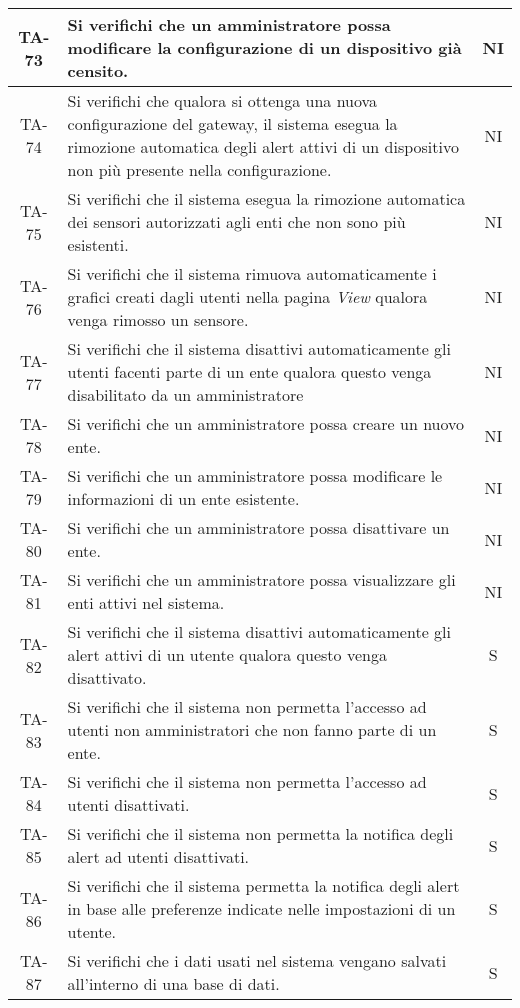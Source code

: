 \begin{center}
\begin{longtable}{|c|p{10cm}|c|}
			 \hline
			 TA-73 & Si verifichi che un amministratore possa modificare la configurazione di un dispositivo già censito. & NI \\
			 \hline
			 TA-74 & Si verifichi che qualora si ottenga una nuova configurazione del gateway, il sistema esegua la rimozione automatica degli alert attivi di un dispositivo non più presente nella configurazione. & NI \\
			 \hline
			 TA-75 & Si verifichi che il sistema esegua la rimozione automatica dei sensori autorizzati agli enti che non sono più esistenti. & NI \\
			 \hline
			 TA-76 & Si verifichi che il sistema rimuova automaticamente i grafici creati dagli utenti nella pagina \textit{View} qualora venga rimosso un sensore. & NI \\
			 \hline
			 TA-77 & Si verifichi che il sistema disattivi automaticamente gli utenti facenti parte di un ente qualora questo venga disabilitato da un amministratore & NI \\
			 \hline
			 TA-78 & Si verifichi che un amministratore possa creare un nuovo ente. & NI \\
			 \hline
			 TA-79 & Si verifichi che un amministratore possa modificare le informazioni di un ente esistente. & NI \\
			 \hline
			 TA-80 & Si verifichi che un amministratore possa disattivare un ente. & NI \\
			 \hline
			 TA-81 & Si verifichi che un amministratore possa visualizzare gli enti attivi nel sistema. & NI \\
			 \hline
			 TA-82 & Si verifichi che il sistema disattivi automaticamente gli alert attivi di un utente qualora questo venga disattivato. & S \\
			 \hline
			 TA-83 & Si verifichi che il sistema non permetta l'accesso ad utenti non amministratori che non fanno parte di un ente. & S \\
			 \hline
			 TA-84 & Si verifichi che il sistema non permetta l'accesso ad utenti disattivati. & S \\
			 \hline
			 TA-85 & Si verifichi che il sistema non permetta la notifica degli alert ad utenti disattivati. & S \\
			 \hline
			 TA-86 & Si verifichi che il sistema permetta la notifica degli alert in base alle preferenze indicate nelle impostazioni di un utente. & S \\
			 \hline
			 TA-87 & Si verifichi che i dati usati nel sistema vengano salvati all'interno di una base di dati. & S \\

\end{longtable}
\end{center}
